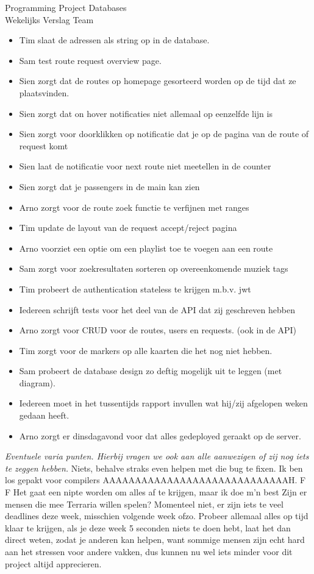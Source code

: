 \documentclass{article}
\newcounter{team}
\begin{document}
\begin{Minutes}{Programming Project Databases \\ Wekelijks Verslag Team }
			\begin{itemize}
			   \item Tim slaat de adressen als string op in de database.
			   \item Sam test route request overview page.
			   \item Sien zorgt dat de routes op homepage gesorteerd worden op de tijd dat ze plaatsvinden.
			   \item Sien zorgt dat on hover notificaties niet allemaal op eenzelfde lijn is
			   \item Sien zorgt voor doorklikken op notificatie dat je op de pagina van de route of request komt
			   \item Sien laat de notificatie voor next route niet meetellen in de counter
			   \item Sien zorgt dat je passengers in de main kan zien
			   \item Arno zorgt voor de route zoek functie te verfijnen met ranges
			   \item Tim update de layout van de request accept/reject pagina
			   \item Arno voorziet een optie om een playlist toe te voegen aan een route
			   \item Sam zorgt voor zoekresultaten sorteren op overeenkomende muziek tags
			   \item Tim probeert de authentication stateless te krijgen m.b.v. jwt
			   \item Iedereen schrijft tests voor het deel van de API dat zij geschreven hebben
			   \item Arno zorgt voor CRUD voor de routes, users en requests. (ook in de API)
			   \item Tim zorgt voor de markers op alle kaarten die het nog niet hebben.
			   \item Sam probeert de database design zo deftig mogelijk uit te leggen (met diagram).
			   \item Iedereen moet in het tussentijds rapport invullen wat hij/zij afgelopen weken gedaan heeft.
			   \item Arno zorgt er dinsdagavond voor dat alles gedeployed geraakt op de server.
			\end{itemize}


			\emph{Eventuele varia punten. Hierbij vragen we ook aan alle aanwezigen of zij nog iets te zeggen hebben.}
				    Niets, behalve straks even helpen met die bug te fixen.
				    Ik ben los gepakt voor compilers AAAAAAAAAAAAAAAAAAAAAAAAAAAAAH. F F
				    Het gaat een nipte worden om alles af te krijgen, maar ik doe m'n best
				    Zijn er mensen die mee Terraria willen spelen? Momenteel niet, er zijn iets te veel deadlines deze week, misschien volgende week ofzo.
				    Probeer allemaal alles op tijd klaar te krijgen, als je deze week 5 seconden niets te doen hebt, laat het dan direct weten, zodat je anderen kan helpen, want sommige mensen zijn echt hard aan het stressen voor andere vakken, dus kunnen nu wel iets minder voor dit project altijd apprecieren.



\end{Minutes}
\end{document}
